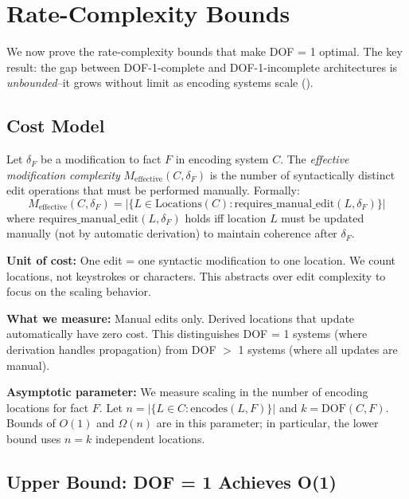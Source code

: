 \section{Rate-Complexity Bounds}\label{sec:bounds}

We now prove the rate-complexity bounds that make DOF = 1 optimal. The key result: the gap between DOF-1-complete and DOF-1-incomplete architectures is \emph{unbounded}--it grows without limit as encoding systems scale ().

\subsection{Cost Model}\label{sec:cost-model}

\begin{definition}\label{def:cost-model}
Let $\delta_F$ be a modification to fact $F$ in encoding system $C$. The \emph{effective modification complexity} $M_{\text{effective}}(C, \delta_F)$ is the number of syntactically distinct edit operations that must be performed manually. Formally:
\[
M_{\text{effective}}(C, \delta_F) = |\{L \in \text{Locations}(C) : \text{requires\_manual\_edit}(L, \delta_F)\}|
\]
where $\text{requires\_manual\_edit}(L, \delta_F)$ holds iff location $L$ must be updated manually (not by automatic derivation) to maintain coherence after $\delta_F$.
\end{definition}

\textbf{Unit of cost:} One edit = one syntactic modification to one location. We count locations, not keystrokes or characters. This abstracts over edit complexity to focus on the scaling behavior.

\textbf{What we measure:} Manual edits only. Derived locations that update automatically have zero cost. This distinguishes DOF = 1 systems (where derivation handles propagation) from DOF $>$ 1 systems (where all updates are manual).

\textbf{Asymptotic parameter:} We measure scaling in the number of encoding locations for fact $F$. Let $n = |\{L \in C : \text{encodes}(L, F)\}|$ and $k = \text{DOF}(C, F)$. Bounds of $O(1)$ and $\Omega(n)$ are in this parameter; in particular, the lower bound uses $n = k$ independent locations.

\subsection{Upper Bound: DOF = 1 Achieves O(1)}\label{sec:upper-bound}

